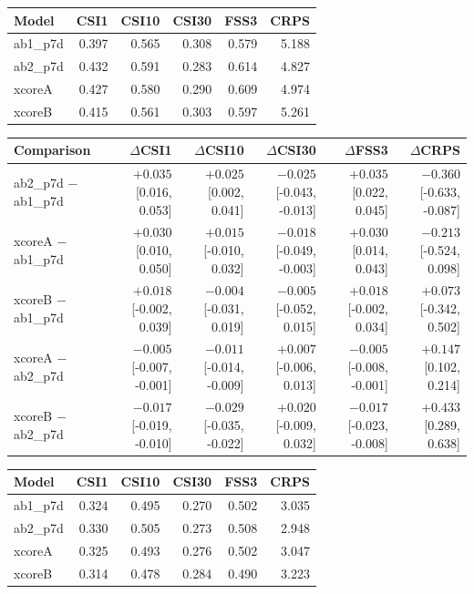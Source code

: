 
\begin{tabular}{lrrrrr}
\toprule
Model & CSI1 & CSI10 & CSI30 & FSS3 & CRPS \\
\midrule
ab1\_p7d & 0.397 & 0.565 & 0.308 & 0.579 & 5.188 \\
ab2\_p7d & 0.432 & 0.591 & 0.283 & 0.614 & 4.827 \\
xcoreA & 0.427 & 0.580 & 0.290 & 0.609 & 4.974 \\
xcoreB & 0.415 & 0.561 & 0.303 & 0.597 & 5.261 \\
\bottomrule
\end{tabular}

\begin{tabular}{lrrrrr}
\toprule
Comparison & $\Delta$CSI1 & $\Delta$CSI10 & $\Delta$CSI30 & $\Delta$FSS3 & $\Delta$CRPS \\
\midrule
ab2\_p7d $-$ ab1\_p7d & $+0.035$ [0.016, 0.053] & $+0.025$ [0.002, 0.041] & $-0.025$ [-0.043, -0.013] & $+0.035$ [0.022, 0.045] & $-0.360$ [-0.633, -0.087] \\
xcoreA $-$ ab1\_p7d & $+0.030$ [0.010, 0.050] & $+0.015$ [-0.010, 0.032] & $-0.018$ [-0.049, -0.003] & $+0.030$ [0.014, 0.043] & $-0.213$ [-0.524, 0.098] \\
xcoreB $-$ ab1\_p7d & $+0.018$ [-0.002, 0.039] & $-0.004$ [-0.031, 0.019] & $-0.005$ [-0.052, 0.015] & $+0.018$ [-0.002, 0.034] & $+0.073$ [-0.342, 0.502] \\
xcoreA $-$ ab2\_p7d & $-0.005$ [-0.007, -0.001] & $-0.011$ [-0.014, -0.009] & $+0.007$ [-0.006, 0.013] & $-0.005$ [-0.008, -0.001] & $+0.147$ [0.102, 0.214] \\
xcoreB $-$ ab2\_p7d & $-0.017$ [-0.019, -0.010] & $-0.029$ [-0.035, -0.022] & $+0.020$ [-0.009, 0.032] & $-0.017$ [-0.023, -0.008] & $+0.433$ [0.289, 0.638] \\
\bottomrule
\end{tabular}

\begin{tabular}{lrrrrr}
\toprule
Model & CSI1 & CSI10 & CSI30 & FSS3 & CRPS \\
\midrule
ab1\_p7d & 0.324 & 0.495 & 0.270 & 0.502 & 3.035 \\
ab2\_p7d & 0.330 & 0.505 & 0.273 & 0.508 & 2.948 \\
xcoreA & 0.325 & 0.493 & 0.276 & 0.502 & 3.047 \\
xcoreB & 0.314 & 0.478 & 0.284 & 0.490 & 3.223 \\
\bottomrule
\end{tabular}

